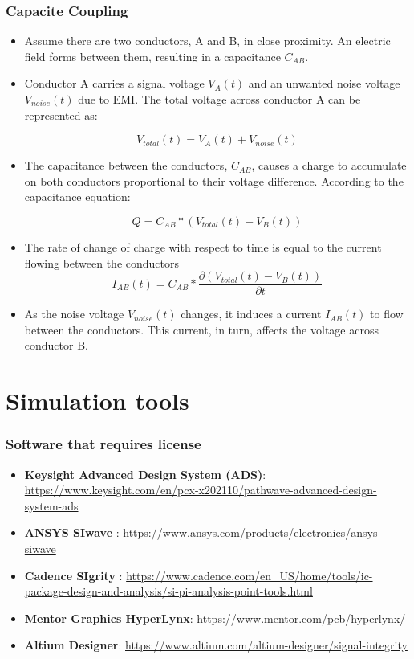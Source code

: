 \documentclass[10pt,hyperref={pdfpagemode=FullScreen},aspectratio=169]{beamer}
\begin{document}
\begin{frame}
  \frametitle{Capacite Coupling}

  \begin{itemize}
    \item Assume there are two conductors, A and B, in close proximity. An electric field forms between them, resulting in a capacitance $C_{AB}$.
    \item Conductor A carries a signal voltage $V_{A}(t)$ and an unwanted noise voltage $V_{noise}(t)$ due to EMI. The total voltage across conductor A can be represented as:
    
    $$V_{total}(t) = V_{A}(t)+ V_{noise}(t)$$

    \item The capacitance between the conductors, $C_{AB}$, causes a charge to accumulate on both conductors proportional to their voltage difference. According to the capacitance equation:

    $$Q = C_{AB} * (V_{total}(t)  - V_{B}(t))$$

    \item The rate of change of charge with respect to time is equal to the current flowing between the conductors
    $$I_{AB}(t) = C_{AB}* \frac{\partial (V_{total}(t)  - V_{B}(t))}{\partial t}$$
    \item As the noise voltage $V_{noise}(t)$ changes, it induces a current $I_{AB}(t)$ to flow between the conductors. This current, in turn, affects the voltage across conductor B.
  \end{itemize}

\end{frame}



\section{Simulation tools}

\begin{frame}
  \frametitle{Software that requires license}
  \begin{itemize}
    \item \textbf{Keysight Advanced Design System (ADS)}: \url{https://www.keysight.com/en/pcx-x202110/pathwave-advanced-design-system-ads}
    \item \textbf{ANSYS SIwave} : \url{https://www.ansys.com/products/electronics/ansys-siwave}
    \item \textbf{Cadence SIgrity} : \url{ https://www.cadence.com/en_US/home/tools/ic-package-design-and-analysis/si-pi-analysis-point-tools.html}
    \item \textbf{Mentor Graphics HyperLynx}: \url{https://www.mentor.com/pcb/hyperlynx/}
    \item \textbf{Altium Designer}: \url{https://www.altium.com/altium-designer/signal-integrity}
    \end{itemize}
  

\end{frame}
\end{document}
